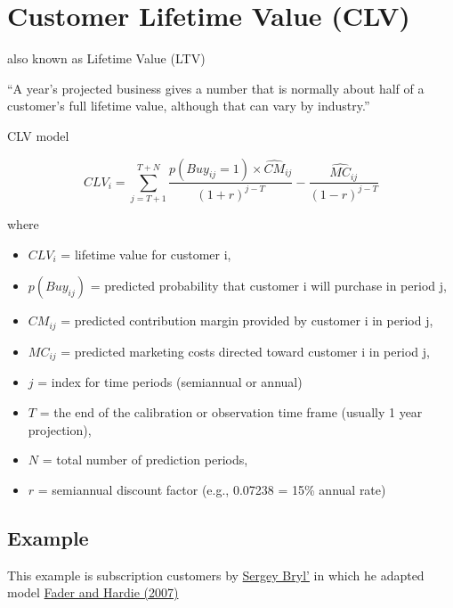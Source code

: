 \documentclass[
]{book}
\providecommand{\tightlist}{%
  \setlength{\itemsep}{0pt}\setlength{\parskip}{0pt}}
\begin{document}
\hypertarget{customer-lifetime-value-clv}{%
\chapter{Customer Lifetime Value (CLV)}\label{customer-lifetime-value-clv}}

also known as Lifetime Value (LTV)

``A year's projected business gives a number that is normally about half of a customer's full lifetime value, although that can vary by industry.'' \citep{kumar_2007}

\citep{Kumar_2008} CLV model

\[
CLV_i = \sum_{j = T+1}^{T+N} \frac{p(Buy_{ij}=1)\times \hat{CM}_{ij}}{(1+r)^{j-T}} - \frac{\hat{MC}_{ij}}{(1-r)^{j-T}}
\]

where

\begin{itemize}
\tightlist
\item
  \(CLV_i\) = lifetime value for customer i,\\
\item
  \(p(Buy_{ij})\) = predicted probability that customer i will purchase in period j,\\
\item
  \(CM_{ij}\) = predicted contribution margin provided by customer i in period j,\\
\item
  \(MC_{ij}\) = predicted marketing costs directed toward customer i in period j,\\
\item
  \(j\) = index for time periods (semiannual or annual)\\
\item
  \(T\) = the end of the calibration or observation time frame (usually 1 year projection),\\
\item
  \(N\) = total number of prediction periods,\\
\item
  \(r\) = semiannual discount factor (e.g., 0.07238 \citep{Kumar_2008} = 15\% annual rate)
\end{itemize}

\hypertarget{example}{%
\section{Example}\label{example}}

This example is subscription customers by \href{https://www.analyzecore.com/2018/09/19/ltv-prediction-for-a-recurring-subscription-with-r/}{Sergey Bryl'} in which he adapted model \href{https://faculty.wharton.upenn.edu/wp-content/uploads/2012/04/Fader_hardie_jim_07.pdf}{Fader and Hardie (2007)}
\end{document}
